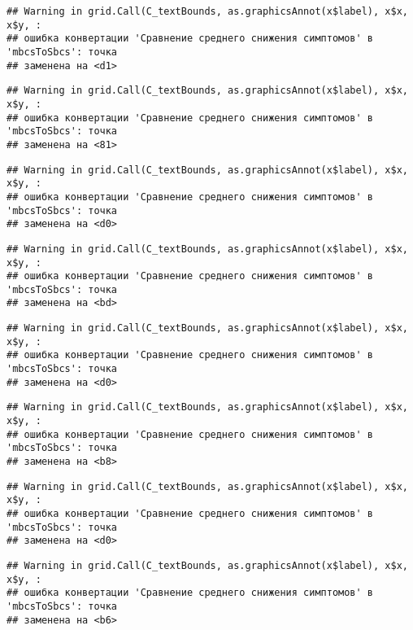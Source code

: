 \documentclass[
]{article}
\begin{document}
\begin{verbatim}
## Warning in grid.Call(C_textBounds, as.graphicsAnnot(x$label), x$x, x$y, :
## ошибка конвертации 'Сравнение среднего снижения симптомов' в 'mbcsToSbcs': точка
## заменена на <d1>
\end{verbatim}

\begin{verbatim}
## Warning in grid.Call(C_textBounds, as.graphicsAnnot(x$label), x$x, x$y, :
## ошибка конвертации 'Сравнение среднего снижения симптомов' в 'mbcsToSbcs': точка
## заменена на <81>
\end{verbatim}

\begin{verbatim}
## Warning in grid.Call(C_textBounds, as.graphicsAnnot(x$label), x$x, x$y, :
## ошибка конвертации 'Сравнение среднего снижения симптомов' в 'mbcsToSbcs': точка
## заменена на <d0>
\end{verbatim}

\begin{verbatim}
## Warning in grid.Call(C_textBounds, as.graphicsAnnot(x$label), x$x, x$y, :
## ошибка конвертации 'Сравнение среднего снижения симптомов' в 'mbcsToSbcs': точка
## заменена на <bd>
\end{verbatim}

\begin{verbatim}
## Warning in grid.Call(C_textBounds, as.graphicsAnnot(x$label), x$x, x$y, :
## ошибка конвертации 'Сравнение среднего снижения симптомов' в 'mbcsToSbcs': точка
## заменена на <d0>
\end{verbatim}

\begin{verbatim}
## Warning in grid.Call(C_textBounds, as.graphicsAnnot(x$label), x$x, x$y, :
## ошибка конвертации 'Сравнение среднего снижения симптомов' в 'mbcsToSbcs': точка
## заменена на <b8>
\end{verbatim}

\begin{verbatim}
## Warning in grid.Call(C_textBounds, as.graphicsAnnot(x$label), x$x, x$y, :
## ошибка конвертации 'Сравнение среднего снижения симптомов' в 'mbcsToSbcs': точка
## заменена на <d0>
\end{verbatim}

\begin{verbatim}
## Warning in grid.Call(C_textBounds, as.graphicsAnnot(x$label), x$x, x$y, :
## ошибка конвертации 'Сравнение среднего снижения симптомов' в 'mbcsToSbcs': точка
## заменена на <b6>
\end{verbatim}
\end{document}
